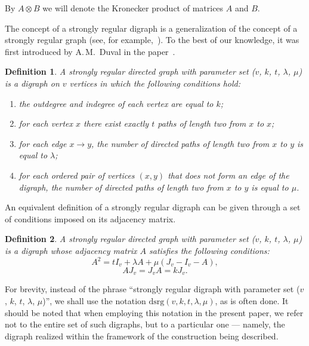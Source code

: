 \documentclass{article}
\newtheorem{definition}{Definition}
\begin{document}
By $A \otimes B$ we will denote the Kronecker product of matrices $A$ and $B$.

The concept of a strongly regular digraph is a generalization of the concept of a strongly regular graph (see, for example,~\cite{bibBose1, bibSRG1}). To the best of our knowledge, it was first introduced by A.\,M.~Duval in the paper~\cite{bibDuval1}.

\begin{definition}
	\label{def:main1}
	A strongly regular directed graph with parameter set ($v$, $k$, $t$, $\lambda$, $\mu$) is a digraph on $v$ vertices in which the following conditions hold:
	\begin{enumerate}
	\item the outdegree and indegree of each vertex are equal to $k$;
	\item for each vertex $x$ there exist exactly $t$ paths of length two from $x$ to $x$;
	\item for each edge $x \to y$, the number of directed paths of length two from $x$ to $y$ is equal to $\lambda$;
	\item for each ordered pair of vertices $(x, y)$ that does not form an edge of the digraph, the number of directed paths of length two from $x$ to $y$ is equal to $\mu$.
	\end{enumerate}
\end{definition}

An equivalent definition of a strongly regular digraph can be given through a set of conditions imposed on its adjacency matrix.

\begin{definition}
	\label{def:main2}
	A strongly regular directed graph with parameter set ($v$, $k$, $t$, $\lambda$, $\mu$) is a digraph whose adjacency matrix $A$ satisfies the following conditions:
    \begin{equation}
	\label{eq:main1}
	A^2 = t I_v + \lambda A + \mu (J_v - I_v - A),
	\end{equation}
	\begin{equation}
	\label{eq:main2}
	A J_v = J_v A = k J_v.
	\end{equation}
\end{definition}

For brevity, instead of the phrase ``strongly regular digraph with parameter set ($v$, $k$, $t$, $\lambda$, $\mu$)'', we shall use the notation $\text{dsrg}(v, k, t, \lambda, \mu)$, as is often done. It should be noted that when employing this notation in the present paper, we refer not to the entire set of such digraphs, but to a particular one --- namely, the digraph realized within the framework of the construction being described.
\end{document}
